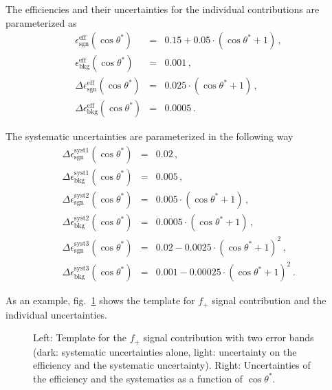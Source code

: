 \documentclass[11pt, a4paper]{article}
\begin{document}
The efficiencies and their uncertainties for the individual
contributions are parameterized as
%
\begin{eqnarray*}
\epsilon_{\mathrm{sgn}}^{\mathrm{eff}}(\cos \theta^{*}) & = & 0.15 + 0.05 \cdot (\cos \theta^{*}+1)\, , \\ 
\epsilon_{\mathrm{bkg}}^{\mathrm{eff}}(\cos \theta^{*}) & = & 0.001\, , \\ 
\Delta \epsilon_{\mathrm{sgn}}^{\mathrm{eff}}(\cos \theta^{*}) & = & 0.025\cdot(\cos \theta^{*} + 1)\, , \\
\Delta \epsilon_{\mathrm{bkg}}^{\mathrm{eff}}(\cos \theta^{*}) & = & 0.0005\, .
\end{eqnarray*}

The systematic uncertainties are parameterized in the following way 
% 
\begin{eqnarray*}
\Delta \epsilon_{\mathrm{sgn}}^{\mathrm{syst 1}}(\cos \theta^{*}) & = & 0.02 \, , \\
\Delta \epsilon_{\mathrm{bkg}}^{\mathrm{syst 1}}(\cos \theta^{*}) & = & 0.005 \, , \\
\Delta \epsilon_{\mathrm{sgn}}^{\mathrm{syst 2}}(\cos \theta^{*}) & = & 0.005\cdot(\cos \theta^{*} + 1) \, , \\
\Delta \epsilon_{\mathrm{bkg}}^{\mathrm{syst 2}}(\cos \theta^{*}) & = & 0.0005\cdot(\cos \theta^{*} + 1) \, , \\
\Delta \epsilon_{\mathrm{sgn}}^{\mathrm{syst 3}}(\cos \theta^{*}) & = & 0.02 -  0.0025 \cdot(\cos \theta^{*} + 1)^{2} \, , \\
\Delta \epsilon_{\mathrm{bkg}}^{\mathrm{syst 3}}(\cos \theta^{*}) & = & 0.001 - 0.00025 \cdot (\cos \theta^{*} + 1)^{2} \, . 
\end{eqnarray*}

As an example, fig.~\ref{fig:tempexample} shows the template for
$f_{+}$ signal contribution and the individual uncertainties. 

\begin{figure}
\begin{center}
\caption{Left: Template for the $f_{+}$ signal contribution with two
 error bands (dark: systematic uncertainties alone, light: uncertainty
 on the efficiency and the systematic uncertainty). Right:
 Uncertainties of the efficiency and the systematics as a function of
 $\cos \theta^{*}$.}
\label{fig:tempexample}
\end{center}
\end{figure}

\clearpage
\pagebreak
\end{document}
